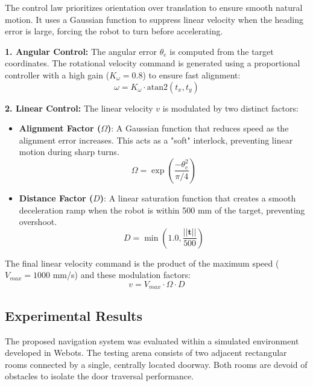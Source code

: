 \documentclass[conference]{IEEEtran}
\begin{document}
    \vspace{0.1cm}
    
    The control law prioritizes orientation over translation to ensure smooth natural motion. It uses a Gaussian function to suppress linear velocity when the heading error is large, forcing the robot to turn before accelerating.

    \vspace{0.1cm}
    
    \textbf{1. Angular Control:}
    The angular error $\theta_e$ is computed from the target coordinates. The rotational velocity command is generated using a proportional controller with a high gain ($K_\omega = 0.8$) to ensure fast alignment:
    \begin{equation}
        \omega = K_\omega \cdot \text{atan2}(t_x, t_y)
    \end{equation}
    
    \textbf{2. Linear Control:}
    The linear velocity $v$ is modulated by two distinct factors:
    \begin{itemize}
        \item \textbf{Alignment Factor ($\Omega$)}: A Gaussian function that reduces speed as the alignment error increases. This acts as a "soft" interlock, preventing linear motion during sharp turns.
        \begin{equation}
            \Omega = \exp\left( \frac{-\theta_e^2}{\pi/4} \right)
        \end{equation}
        \item \textbf{Distance Factor ($D$)}: A linear saturation function that creates a smooth deceleration ramp when the robot is within 500 mm of the target, preventing overshoot.
        \begin{equation}
            D = \min\left(1.0, \frac{||\mathbf{t}||}{500}\right)
        \end{equation}
    \end{itemize}
    
    The final linear velocity command is the product of the maximum speed ($V_{max} = 1000$ mm/s) and these modulation factors:
    \begin{equation}
        v = V_{max} \cdot \Omega \cdot D
    \end{equation}    
    \subsection{Experimental Results}
    The proposed navigation system was evaluated within a simulated environment developed in Webots. The testing arena consists of two adjacent rectangular rooms connected by a single, centrally located doorway. Both rooms are devoid of obstacles to isolate the door traversal performance. 
    
\end{document}
